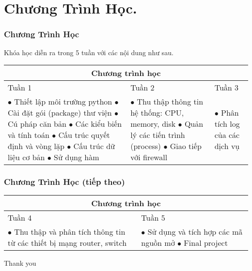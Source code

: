 \documentclass{beamer}
\begin{document}
\section{Chương Trình Học.} 
\begin{frame}[label=sylabus]
\frametitle{Chương Trình Học}

Khóa học diễn ra trong 5 tuần với các nội dung như sau. 

\begin{tabular}{ |p{4cm}||p{3cm}||p{3cm}|  }
 \hline
 \multicolumn{3}{|c|}{Chương trình học} \\
 \hline
 Tuần 1& Tuần 2 & Tuần 3 \\
 \hline
  $\bullet$ Thiết lập môi trường python \newline
  $\bullet$ Cài đặt gói (package) thư viện \newline      
  $\bullet$ Cú pháp căn bản \newline
  $\bullet$ Các kiểu biến và tính toán \newline
  $\bullet$ Cấu trúc quyết định và vòng lặp \newline
  $\bullet$ Cấu trúc dữ liệu cơ bản  \newline
  $\bullet$ Sử dụng hàm   \newline
   & $\bullet$ Thu thập thông tin hệ thống: CPU, memory, disk \newline
   $\bullet$ Quản lý các tiến trình (process) \newline $\bullet$ Giao tiếp với firewall \newline   & $\bullet$ Phân tích log của các dịch vụ \newline \\
 \hline
\end{tabular}

 
\hyperlink{fe}{}
\hyperlink{plan}{}
\end{frame}

\begin{frame}[label=syllabus]
\frametitle{Chương Trình Học (tiếp theo)}

\begin{tabular}{ |p{4cm}||p{4cm}||  }
 \hline
 \multicolumn{2}{|c|}{Chương trình học} \\
 \hline
 Tuần 4 & Tuần 5  \\
 \hline
$\bullet$ Thu thập và phân tích thông tin từ các thiết bị mạng router, switch \newline
   & $\bullet$ Sử dụng và tích hợp các mã nguồn mở   \newline  $\bullet$ Final project  \newline   \\
 \hline
\end{tabular}

\hyperlink{currentwork}{}

\end{frame}




\begin{frame}
\Huge{\centerline{Thank you}}
\end{frame}

\end{document}
